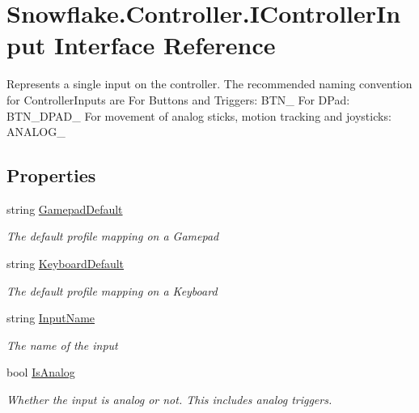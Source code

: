 \hypertarget{interface_snowflake_1_1_controller_1_1_i_controller_input}{}\section{Snowflake.\+Controller.\+I\+Controller\+Input Interface Reference}
\label{interface_snowflake_1_1_controller_1_1_i_controller_input}


Represents a single input on the controller. The recommended naming convention for Controller\+Inputs are For Buttons and Triggers\+: B\+T\+N\+\_\+ For D\+Pad\+: B\+T\+N\+\_\+\+D\+P\+A\+D\+\_\+ For movement of analog sticks, motion tracking and joysticks\+: A\+N\+A\+L\+O\+G\+\_\+  


\subsection*{Properties}
\begin{DoxyCompactItemize}
\item 
string \hyperlink{interface_snowflake_1_1_controller_1_1_i_controller_input_af599b54bfd5d01c182b8fa10f0918ee8}{Gamepad\+Default}
\begin{DoxyCompactList}\small\item\em The default profile mapping on a Gamepad \end{DoxyCompactList}\item 
string \hyperlink{interface_snowflake_1_1_controller_1_1_i_controller_input_a9599c185a4863e50674e57b10f3ea2dc}{Keyboard\+Default}
\begin{DoxyCompactList}\small\item\em The default profile mapping on a Keyboard \end{DoxyCompactList}\item 
string \hyperlink{interface_snowflake_1_1_controller_1_1_i_controller_input_aee56ea454294051639b2d30948a9cab5}{Input\+Name}
\begin{DoxyCompactList}\small\item\em The name of the input \end{DoxyCompactList}\item 
bool \hyperlink{interface_snowflake_1_1_controller_1_1_i_controller_input_a461bb3f22adf309804329b1fc92cee60}{Is\+Analog}
\begin{DoxyCompactList}\small\item\em Whether the input is analog or not. This includes analog triggers. \end{DoxyCompactList}\end{DoxyCompactItemize}


